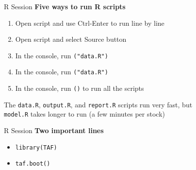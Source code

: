 \documentclass[aspectratio=169]{beamer}
\begin{document}
\begin{frame}{R Session}
  \textbf{\darkgreen Five ways to run R scripts}\\[1.5ex]
  \begin{enumerate}
    \item Open script and use {\darkblue Ctrl-Enter} to run line by line\\[2ex]
    \item Open script and select {\darkblue Source} button\\[2ex]
    \item In the console, run {\tt {}("data.R")}\\[2ex]
    \item In the console, run {\tt {}("data.R")}\\[2ex]
    \item In the console, run {\tt {}()} to run all the
    scripts\\[2ex]
  \end{enumerate}
  \vspace{1ex}
  The {\tt\darkgreen data.R}, {\tt\darkgreen output.R}, and
  {\tt\darkgreen report.R} scripts run very fast, but\\[0.2ex]
  {\tt\orange model.R} takes longer to run (a few minutes per stock)
\end{frame}


\begin{frame}[fragile]{R Session}
  \textbf{\darkgreen Two important lines}\\[0.3ex]
  \begin{itemize}
    \item[] \verb|library(TAF)|\\[1ex]
    \item[] \verb|taf.boot()|\\[1ex]
  \end{itemize}
\end{frame}

\end{document}

